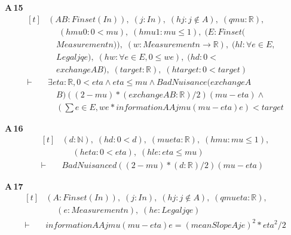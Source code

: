 \noindent\textbf{A\,15}\quad{}
{\footnotesize\[ \begin{aligned}[t]
&(\mathit{A} \mathit{B} : \mathit{Finset} (\mathit{I} \mathit{n})),\; (\mathit{j} : \mathit{I} \mathit{n}),\; (\mathit{hj} : \mathit{j} \notin \mathit{A}),\; (\mathit{q} \mathit{mu} : \mathbb{R} ),\\
&\quad \; (\mathit{hmu0} : 0 < \mathit{mu}),\; (\mathit{hmu1} : \mathit{mu} \leq 1),\; (\mathit{E} : \mathit{Finset} (\\
&\quad \mathit{Measurement} \mathit{n})),\; (\mathit{w} : \mathit{Measurement} \mathit{n} \to \mathbb{R} ),\; (\mathit{hl} : \forall \mathit{e} \in \mathit{E},\\
&\quad \mathit{Legal} \mathit{j} \mathit{q} \mathit{e}),\; (\mathit{hw} : \forall \mathit{e} \in \mathit{E}, 0 \leq \mathit{w} \mathit{e}),\; (\mathit{hd} : 0 <\\
&\quad \mathit{exchange} \mathit{A} \mathit{B}),\; (\mathit{target} : \mathbb{R} ),\; (\mathit{htarget} : 0 < \mathit{target})\\
\vdash\;&\exists \mathit{eta} : \mathbb{R} , 0 < \mathit{eta} \wedge \mathit{eta} \leq \mathit{mu} \wedge \mathit{BadNuisance} (\mathit{exchange} \mathit{A}\\
&\quad \mathit{B}) ((2-\mathit{mu})*(\mathit{exchange} \mathit{A} \mathit{B}:\mathbb{R} )/2) (\mathit{mu}-\mathit{eta}) \wedge\\
&\quad (\textstyle\sum \mathit{e} \in \mathit{E},\mathit{w} \mathit{e}*\mathit{information} \mathit{A} \mathit{A} \mathit{j} \mathit{mu} (\mathit{mu}-\mathit{eta}) \mathit{e}) < \mathit{target}
\end{aligned} \]}

\noindent\textbf{A\,16}\quad{}
{\footnotesize\[ \begin{aligned}[t]
&(\mathit{d} : \mathbb{N} ),\; (\mathit{hd} : 0 < \mathit{d}),\; (\mathit{mu} \mathit{eta} : \mathbb{R} ),\; (\mathit{hmu} : \mathit{mu} \leq 1),\\
&\quad \; (\mathit{heta} : 0 < \mathit{eta}),\; (\mathit{hle} : \mathit{eta} \leq \mathit{mu})\\
\vdash\;&\mathit{BadNuisance} \mathit{d} ((2-\mathit{mu})*(\mathit{d}:\mathbb{R} )/2) (\mathit{mu}-\mathit{eta})
\end{aligned} \]}

\noindent\textbf{A\,17}\quad{}
{\footnotesize\[ \begin{aligned}[t]
&(\mathit{A} : \mathit{Finset} (\mathit{I} \mathit{n})),\; (\mathit{j} : \mathit{I} \mathit{n}),\; (\mathit{hj} : \mathit{j} \notin \mathit{A}),\; (\mathit{q} \mathit{mu} \mathit{eta} : \mathbb{R} ),\\
&\quad \; (\mathit{e} : \mathit{Measurement} \mathit{n}),\; (\mathit{he} : \mathit{Legal} \mathit{j} \mathit{q} \mathit{e})\\
\vdash\;&\mathit{information} \mathit{A} \mathit{A} \mathit{j} \mathit{mu} (\mathit{mu}-\mathit{eta}) \mathit{e} = (\mathit{meanSlope} \mathit{A} \mathit{j} \mathit{e})^{2}*\mathit{eta}^{2}/2
\end{aligned} \]}

